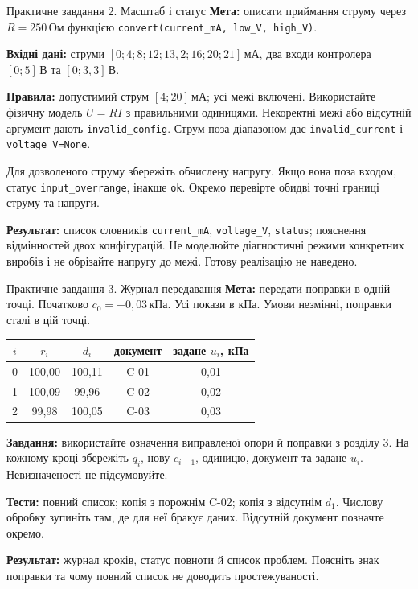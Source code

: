 \documentclass[aspectratio=169,11pt]{beamer}
\newcommand{\unit}[1]{\,\text{#1}}
\begin{document}
\begin{frame}[t]{Практичне завдання 2. Масштаб і статус}
\small
\textbf{Мета:} описати приймання струму через $R=250\unit{Ом}$ функцією \texttt{convert(current\_mA, low\_V, high\_V)}.
\par\medskip
\textbf{Вхідні дані:} струми $[0;4;8;12;13{,}2;16;20;21]\unit{мА}$, два входи контролера $[0;5]\unit{В}$ та $[0;3{,}3]\unit{В}$.
\par\medskip
\textbf{Правила:} допустимий струм $[4;20]\unit{мА}$; усі межі включені. Використайте фізичну модель $U=RI$ з правильними одиницями. Некоректні межі або відсутній аргумент дають \texttt{invalid\_config}. Струм поза діапазоном дає \texttt{invalid\_current} і \texttt{voltage\_V=None}.
\par\medskip
Для дозволеного струму збережіть обчислену напругу. Якщо вона поза входом, статус \texttt{input\_overrange}, інакше \texttt{ok}. Окремо перевірте обидві точні границі струму та напруги.
\par\medskip
\textbf{Результат:} список словників \texttt{current\_mA}, \texttt{voltage\_V}, \texttt{status}; пояснення відмінностей двох конфігурацій. Не моделюйте діагностичні режими конкретних виробів і не обрізайте напругу до межі. Готову реалізацію не наведено.
\end{frame}

\begin{frame}[t]{Практичне завдання 3. Журнал передавання}
\small
\textbf{Мета:} передати поправки в одній точці. Початково $c_0=+0{,}03\unit{кПа}$. Усі покази в кПа. Умови незмінні, поправки сталі в цій точці.
\begin{center}\begin{tabular}{ccccc}\toprule
$i$ & $r_i$ & $d_i$ & документ & задане $u_i$, кПа\\\midrule
0 & 100,00 & 100,11 & C-01 & 0,01\\
1 & 100,09 & 99,96 & C-02 & 0,02\\
2 & 99,98 & 100,05 & C-03 & 0,03\\\bottomrule
\end{tabular}\end{center}
\textbf{Завдання:} використайте означення виправленої опори й поправки з розділу 3. На кожному кроці збережіть $q_i$, нову $c_{i+1}$, одиницю, документ та задане $u_i$. Невизначеності не підсумовуйте.
\par\medskip
\textbf{Тести:} повний список; копія з порожнім C-02; копія з відсутнім $d_1$. Числову обробку зупиніть там, де для неї бракує даних. Відсутній документ позначте окремо.
\par\medskip
\textbf{Результат:} журнал кроків, статус повноти й список проблем. Поясніть знак поправки та чому повний список не доводить простежуваності.
\end{frame}
\end{document}
